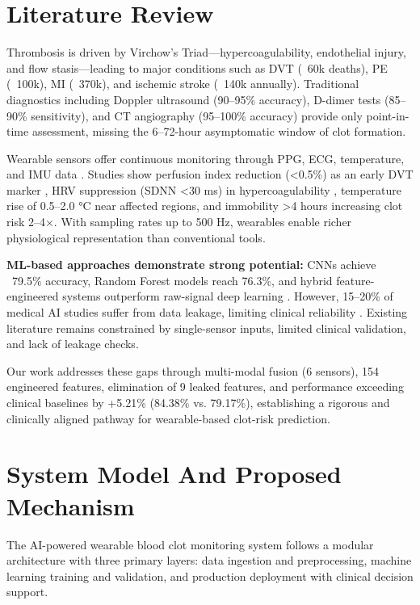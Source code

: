\documentclass[3p,times,procedia]{elsarticle}
\begin{document}
\section{Literature Review}
\label{sec:prelim}
\vspace{-3pt}
Thrombosis is driven by Virchow’s Triad—hypercoagulability, endothelial injury, and flow stasis—leading to major conditions such as DVT (~60k deaths), PE (~100k), MI (~370k), and ischemic stroke (~140k annually). Traditional diagnostics including Doppler ultrasound (90–95\% accuracy), D-dimer tests (85–90\% sensitivity), and CT angiography (95–100\% accuracy) provide only point-in-time assessment, missing the 6–72-hour asymptomatic window of clot formation.

Wearable sensors offer continuous monitoring through PPG, ECG, temperature, and IMU data \cite{elgendi2012ppg,perez2019smartwatch}. Studies show perfusion index reduction (<0.5\%) as an early DVT marker \cite{lima2005perfusion,forget2010perfusion}, HRV suppression (SDNN <30 ms) in hypercoagulability \cite{shaffer2017hrv,laborde2017hrv}, temperature rise of 0.5–2.0 °C near affected regions, and immobility >4 hours increasing clot risk 2–4×. With sampling rates up to 500 Hz, wearables enable richer physiological representation than conventional tools.

\textbf{ML-based approaches demonstrate strong potential:} CNNs achieve ~79.5\% accuracy, Random Forest models reach 76.3\%, and hybrid feature-engineered systems outperform raw-signal deep learning \cite{rajpurkar2017arrhythmia,topol2019high}. However, 15–20\% of medical AI studies suffer from data leakage, limiting clinical reliability \cite{kaufman2012leakage,kapoor2023leakage}. Existing literature remains constrained by single-sensor inputs, limited clinical validation, and lack of leakage checks.

Our work addresses these gaps through multi-modal fusion (6 sensors), 154 engineered features, elimination of 9 leaked features, and performance exceeding clinical baselines by +5.21\% (84.38\% vs. 79.17\%), establishing a rigorous and clinically aligned pathway for wearable-based clot-risk prediction.
\section{System Model And Proposed Mechanism}
\label{sec:fin}
\vspace{-3pt}
The AI-powered wearable blood clot monitoring system follows a modular architecture with three primary layers: data ingestion and preprocessing, machine learning training and validation, and production deployment with clinical decision support.
\end{document}
